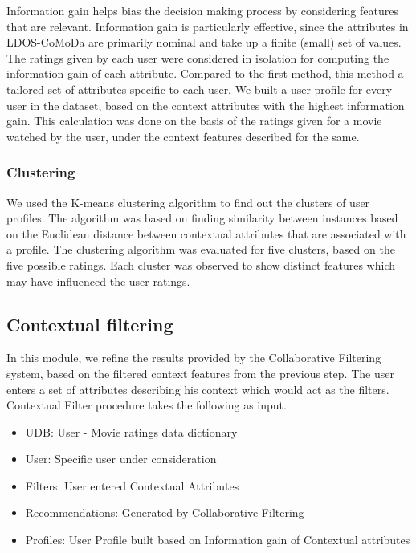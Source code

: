 \documentclass{article}
\begin{document}
Information gain helps bias the decision making process by considering features that are relevant. Information gain is particularly effective, since the attributes in LDOS-CoMoDa are primarily nominal and take up a finite (small) set of values. The ratings given by each user were considered in isolation for computing the information gain of each attribute. Compared to the first method, this method a tailored set of attributes specific to each user. We built a user profile for every user in the dataset, based on the context attributes with the highest information gain. This calculation was done on the basis of the ratings given for a movie watched by the user, under the context features described for the same.

\subsubsection{Clustering}

 We used the K-means clustering algorithm to find out the clusters of user profiles. The algorithm was based on finding similarity between instances based on the Euclidean distance between contextual attributes that are associated with a profile. The clustering algorithm was evaluated for five clusters, based on the five possible ratings. Each cluster was observed to show distinct features which may have influenced the user ratings.

\subsection{Contextual filtering}
In this module, we refine the results provided by the Collaborative Filtering system, based on the filtered context features from the previous step. The user enters a set of attributes describing his context which would act as the filters. Contextual Filter procedure takes the following as input.

\begin{itemize}
\item UDB: User - Movie ratings data dictionary
\item User: Specific user under consideration 
\item Filters: User entered Contextual Attributes	
\item Recommendations: Generated by Collaborative Filtering
\item Profiles: User Profile built based on Information gain of Contextual attributes
\end{itemize}
\end{document}
